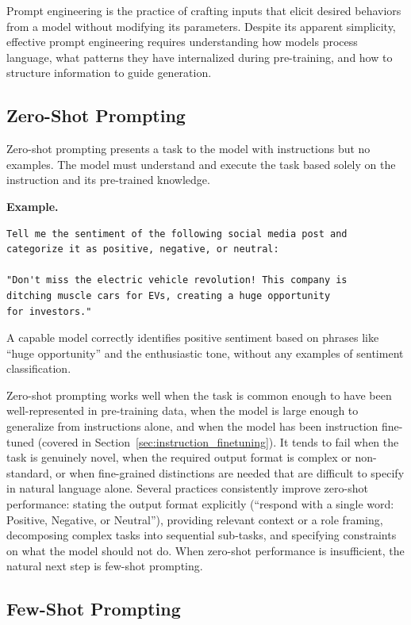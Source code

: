 \documentclass{book}
\begin{document}
Prompt engineering is the practice of crafting inputs that elicit desired
behaviors from a model without modifying its parameters. Despite its
apparent simplicity, effective prompt engineering requires understanding
how models process language, what patterns they have internalized during
pre-training, and how to structure information to guide generation.

\subsection{Zero-Shot Prompting}
\label{sec:zero_shot}

Zero-shot prompting presents a task to the model with instructions but no
examples. The model must understand and execute the task based solely on
the instruction and its pre-trained knowledge.

\textbf{Example.}
\begin{verbatim}
Tell me the sentiment of the following social media post and
categorize it as positive, negative, or neutral:

"Don't miss the electric vehicle revolution! This company is
ditching muscle cars for EVs, creating a huge opportunity
for investors."
\end{verbatim}

A capable model correctly identifies positive sentiment based on phrases
like ``huge opportunity'' and the enthusiastic tone, without any examples
of sentiment classification.

Zero-shot prompting works well when the task is common enough to have been
well-represented in pre-training data, when the model is large enough to
generalize from instructions alone, and when the model has been instruction
fine-tuned (covered in Section~\ref{sec:instruction_finetuning}). It tends
to fail when the task is genuinely novel, when the required output format
is complex or non-standard, or when fine-grained distinctions are needed
that are difficult to specify in natural language alone. Several practices
consistently improve zero-shot performance: stating the output format
explicitly (``respond with a single word: Positive, Negative, or Neutral''),
providing relevant context or a role framing, decomposing complex tasks
into sequential sub-tasks, and specifying constraints on what the model
should not do. When zero-shot performance is insufficient, the natural
next step is few-shot prompting.

\subsection{Few-Shot Prompting}
\label{sec:few_shot}
\end{document}
